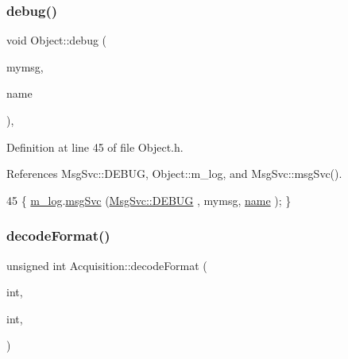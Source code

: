 \subsubsection{\texorpdfstring{debug()}{debug()}\hspace{0.1cm}{\footnotesize\ttfamily [2/2]}}
{\footnotesize\ttfamily void Object\+::debug (\begin{DoxyParamCaption}\item[{std\+::string}]{mymsg,  }\item[{std\+::string}]{name }\end{DoxyParamCaption})\hspace{0.3cm}{\ttfamily [inline]}, {\ttfamily [inherited]}}



Definition at line 45 of file Object.\+h.



References Msg\+Svc\+::\+D\+E\+B\+UG, Object\+::m\+\_\+log, and Msg\+Svc\+::msg\+Svc().


\begin{DoxyCode}
45 \{ \hyperlink{classObject_a0d269813dd7ac1f24bc143031e2963f2}{m\_log}.\hyperlink{classMsgSvc_ad25f18047920cc59a314e5098259711c}{msgSvc} (\hyperlink{classMsgSvc_ae671eb7301996cd049d2da8a65925926a1dbdcc82dce88370ec335883c83b38b0}{MsgSvc::DEBUG}   , mymsg, \hyperlink{classObject_a300f4c05dd468c7bb8b3c968868443c1}{name} ); \}
\end{DoxyCode}
\mbox{\label{classAcquisition_a76fe7c020f7097e5d479867ba783ba31}} 
\subsubsection{\texorpdfstring{decode\+Format()}{decodeFormat()}\hspace{0.1cm}{\footnotesize\ttfamily [1/2]}}
{\footnotesize\ttfamily unsigned int Acquisition\+::decode\+Format (\begin{DoxyParamCaption}\item[{unsigned}]{int,  }\item[{unsigned}]{int,  }\item[{\hyperlink{classRAM}{R\+AM} $\ast$}]{ }\end{DoxyParamCaption})\hspace{0.3cm}{\ttfamily [protected]}}

\mbox{\label{classAcquisition_a76fe7c020f7097e5d479867ba783ba31}} 
